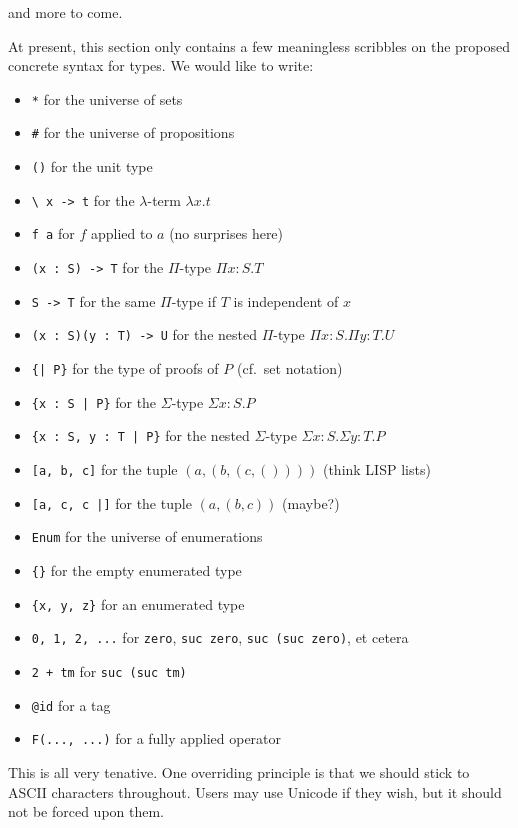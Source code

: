 and more to come.




At present, this section only contains a few meaningless scribbles on the 
proposed concrete syntax for types. We would like to write:

\begin{itemize}
\item \verb!*! for the universe of sets
\item \verb!#! for the universe of propositions
\item \verb|()| for the unit type
\item \verb!\ x -> t! for the $\lambda$-term $\lambda x.t$
\item \verb|f a| for $f$ applied to $a$ (no surprises here)
\item \verb!(x : S) -> T! for the $\Pi$-type $\Pi x:S. T$
\item \verb!S -> T! for the same $\Pi$-type if $T$ is independent of $x$
\item \verb!(x : S)(y : T) -> U! for the nested $\Pi$-type $\Pi x:S. \Pi y:T. U$
\item \verb!{| P}! for the type of proofs of $P$ (cf.\ set notation)
\item \verb!{x : S | P}! for the $\Sigma$-type $\Sigma x:S. P$
\item \verb!{x : S, y : T | P}! for the nested $\Sigma$-type $\Sigma x:S. \Sigma y:T. P$
\item \verb![a, b, c]! for the tuple $(a, (b, (c, ())))$ (think LISP lists)
\item \verb![a, c, c |]! for the tuple $(a, (b, c))$ (maybe?)
\item \verb!Enum! for the universe of enumerations
\item \verb!{}! for the empty enumerated type
\item \verb!{x, y, z}! for an enumerated type
\item \verb!0, 1, 2, ...! for \verb!zero!, \verb!suc zero!, \verb!suc (suc zero)!, et cetera
\item \verb!2 + tm! for \verb!suc (suc tm)!
\item \verb!@id! for a tag
\item \verb!F(..., ...)! for a fully applied operator
\end{itemize}



This is all very tenative. One overriding principle is that we should stick to ASCII
characters throughout. Users may use Unicode if they wish, but it should not be
forced upon them.
